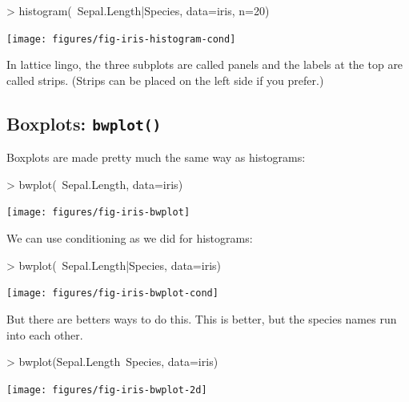 \begin{center}
\begin{Schunk}
\begin{Sinput}
> histogram(~Sepal.Length|Species, data=iris, n=20)
\end{Sinput}
\end{Schunk}
\texttt{[image: figures/fig-iris-histogram-cond]}
\end{center}


In lattice lingo, the three subplots are called panels and the 
labels at the top are called strips.  (Strips can be placed on the left side if you 
prefer.)


\subsection{Boxplots:  \texttt{bwplot()}}

Boxplots are made pretty much the same way as histograms:
\begin{center}
\begin{Schunk}
\begin{Sinput}
> bwplot(~Sepal.Length, data=iris)
\end{Sinput}
\end{Schunk}
\texttt{[image: figures/fig-iris-bwplot]}
\end{center}

We can use conditioning as we did for histograms:

\begin{center}
\begin{Schunk}
\begin{Sinput}
> bwplot(~Sepal.Length|Species, data=iris)
\end{Sinput}
\end{Schunk}
\texttt{[image: figures/fig-iris-bwplot-cond]}
\end{center}

\vspace{-8mm}

But there are betters ways to do this.
This is better, but the species names run into each other.
\begin{center}
\begin{Schunk}
\begin{Sinput}
> bwplot(Sepal.Length~Species, data=iris)
\end{Sinput}
\end{Schunk}
\texttt{[image: figures/fig-iris-bwplot-2d]}
\end{center}

